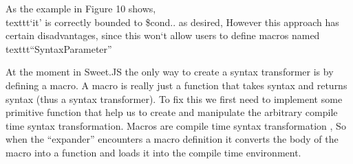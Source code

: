 As the example in Figure 10 shows, \\texttt{`it'} is correctly bounded to \$cond.. as desired, However this approach has certain disadvantages, since this won`t allow users to define macros named \\texttt{``SyntaxParameter''} 

At the moment in Sweet.JS the only way to create a syntax transformer is by defining a macro. A macro is really just a function that takes syntax and returns syntax (thus a syntax transformer). To fix this we first need to implement some primitive function that help us to create and manipulate the arbitrary compile time syntax transformation. Macros are compile time syntax transformation , So when the ``expander'' encounters a macro definition it converts the body of the macro into a function and loads it into the compile time environment.